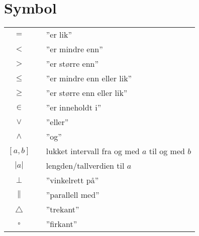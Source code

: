 



\section*{Symbol} \label{Symbol}
\renewcommand{\arraystretch}{1.2}
\begin{tabular}{@{}cp{0.4cm}l}
$ = $ && ''er lik'' \\
$ < $ && ''er mindre enn'' \\
$ > $ && ''er større enn'' \\
$ \leq $ && ''er mindre enn eller lik'' \\
$ \geq $ && ''er større enn eller lik'' \\		
$ \in $ && ''er inneholdt i'' \\
$ \vee $&&''eller''\\
$ \wedge $&&''og''\\
$ [a, b] $ && lukket intervall fra og med $ a $ til og med $ b $\\
$|a| $ &&  lengden/tallverdien til $ a $\\
$\perp $ &&  ''vinkelrett på'' \\
$\parallel $ &&  ''parallell med'' \\
$\triangle $ &&  ''trekant'' \\
$\square $ &&  ''firkant'' \\
\end{tabular}
\renewcommand{\arraystretch}{1}

